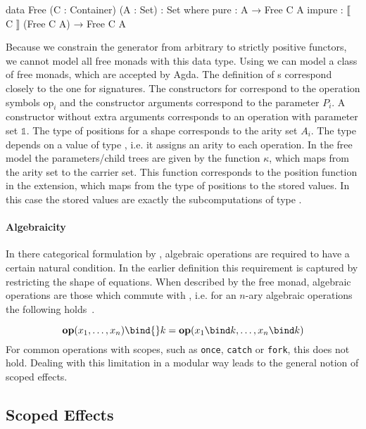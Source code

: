 \begin{code}
data Free (C : Container) (A : Set) : Set where
  pure    : A → Free C A
  impure  : ⟦ C ⟧ (Free C A) → Free C A
\end{code}
Because we constrain the generator from arbitrary to strictly positive functors,
we cannot model all free monads with this data type.
Using  we can model a class of free monads, which are
accepted by Agda.
The definition of s correspond closely to the one for
signatures.
The constructors for  correspond to the operation symbols
$\mathrm{op}_i$ and the constructor arguments correspond to the parameter $P_i$.
A constructor without extra arguments corresponds to an operation with
parameter set $\mathbb{1}$.
The type of positions for a shape corresponds to the arity set $A_i$.
The  type depends on a value of type , i.e. it
assigns an arity to each operation.
In the free model the parameters/child trees are given by the function $\kappa$,
which maps from the arity set to the carrier set.
This function corresponds to the position function in the
 extension, which maps from the type of positions to the
stored values.
In this case the stored values are exactly the subcomputations of type
\AgdaSpace{}\AgdaSpace{}.

\paragraph{Algebraicity}
In there categorical formulation by \textcite{DBLP:conf/fossacs/PlotkinP02},
algebraic operations are required to have a certain natural condition.
In the earlier definition this requirement is captured by restricting the shape
of equations.
When described by the free monad, algebraic operations are those which commute
with \bind{}, i.e. for an $n$-ary algebraic operations the following
holds~\cite{DBLP:conf/lics/PirogSWJ18}.

\[
  \mathbf{op}(x_1,\dots ,x_n) \bind{} k = \mathbf{op}(x_1\bind k,\dots
  ,x_n\bind k)
\]
For common operations with scopes, such as \texttt{once}, \texttt{catch} or
\texttt{fork}, this does not hold.
Dealing with this limitation in a modular way leads to the general notion of
scoped effects.


\subsection{Scoped Effects}
\label{preliminaries:scoped-effects}

